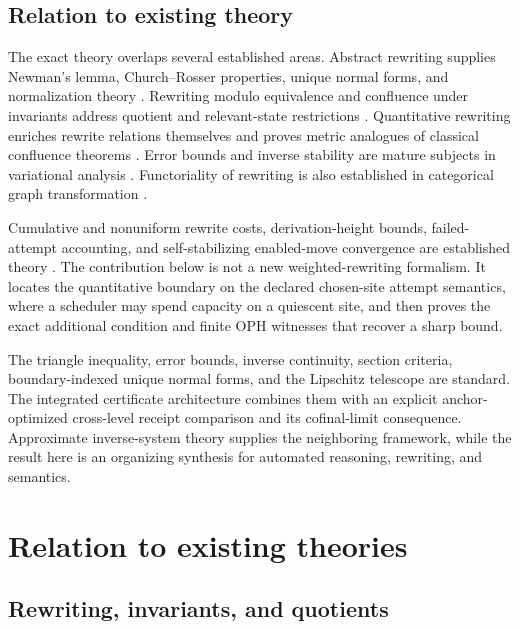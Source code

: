 \documentclass[11pt]{article}
\theoremstyle{definition}
\theoremstyle{remark}
\numberwithin{equation}{section}
\begin{document}
\subsection{Relation to existing theory}

The exact theory overlaps several established areas.  Abstract rewriting supplies Newman's lemma, Church--Rosser properties, unique normal forms, and normalization theory \citep{Newman1942,Huet1980,BaaderNipkow1998,Terese2003,AotoToyama2018}.  Rewriting modulo equivalence and confluence under invariants address quotient and relevant-state restrictions \citep{ChristiansenKirkeby2016,GallFruehwirth2018,CampbellPlump2021,Lucas2025}.  Quantitative rewriting enriches rewrite relations themselves and proves metric analogues of classical confluence theorems \citep{GavazzoDiFlorio2022}.  Error bounds and inverse stability are mature subjects in variational analysis \citep{Kruger2015,CibulkaDontchevKruger2018}.  Functoriality of rewriting is also established in categorical graph transformation \citep{DuvalEchahedProst2011}.

Cumulative and nonuniform rewrite costs, derivation-height bounds, failed-attempt accounting, and self-stabilizing enabled-move convergence are established theory \citep{Dijkstra1974,KopMiddeldorpSternagel2017,AvanziniYamada2025}.  The contribution below is not a new weighted-rewriting formalism.  It locates the quantitative boundary on the declared chosen-site attempt semantics, where a scheduler may spend capacity on a quiescent site, and then proves the exact additional condition and finite OPH witnesses that recover a sharp bound.

The triangle inequality, error bounds, inverse continuity, section criteria,
boundary-indexed unique normal forms, and the Lipschitz telescope are standard.
The integrated certificate architecture combines them with an explicit
anchor-optimized cross-level receipt comparison and its cofinal-limit
consequence.  Approximate inverse-system theory supplies the neighboring
framework, while the result here is an organizing synthesis for automated
reasoning, rewriting, and semantics.

\section{Relation to existing theories}\label{sec:related}

\subsection{Rewriting, invariants, and quotients}
\end{document}
